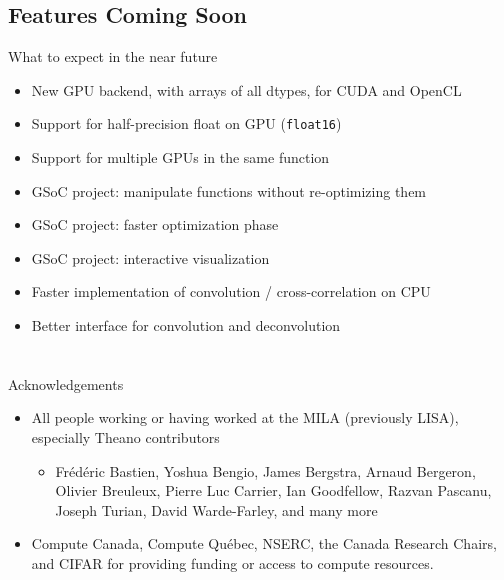 \documentclass[a4paper,9pt]{beamer}
\begin{document}
\subsection{Features Coming Soon}
\begin{frame}[fragile]{What to expect in the near future}
  \begin{itemize}
    \item New GPU backend, with arrays of all dtypes, for CUDA and OpenCL
    \item Support for half-precision float on GPU (\verb|float16|)
    \item Support for multiple GPUs in the same function
    \item GSoC project: manipulate functions without re-optimizing them
    \item GSoC project: faster optimization phase
    \item GSoC project: interactive visualization
    \item Faster implementation of convolution / cross-correlation on CPU
    \item Better interface for convolution and deconvolution
  \end{itemize}
\end{frame}


\section{}

\begin{frame}{Acknowledgements}
  \begin{itemize}
    \item All people working or having worked at the MILA (previously LISA), especially Theano contributors
      \begin{itemize}
        \item
          Frédéric Bastien,
          Yoshua Bengio,
          James Bergstra,
          Arnaud Bergeron,
          Olivier Breuleux,
          Pierre Luc Carrier,
          Ian Goodfellow,
          Razvan Pascanu,
          Joseph Turian,
          David Warde-Farley,
          and many more
      \end{itemize}
    \item Compute Canada, Compute Québec, NSERC, the Canada Research Chairs, and CIFAR for providing funding or access to compute resources.
  \end{itemize}
\end{frame}
\end{document}
